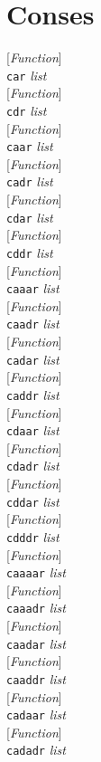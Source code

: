 \documentclass[10pt]{book}
\newenvironment{defother}[2]{[\textit{#1}]\\\texttt{#2}}{\\}
\newenvironment{defun}[1]{\begin{defother}{Function}{#1}}{\end{defother}}
\begin{document}
\section{Conses}
\begin{defun}{car} \textit{list} \end{defun}
\begin{defun}{cdr} \textit{list}\end{defun}
\begin{defun}{caar} \textit{list}\end{defun}
\begin{defun}{cadr} \textit{list}\end{defun}
\begin{defun}{cdar} \textit{list}\end{defun}
\begin{defun}{cddr} \textit{list}\end{defun}
\begin{defun}{caaar} \textit{list}\end{defun}
\begin{defun}{caadr} \textit{list}\end{defun}
\begin{defun}{cadar} \textit{list}\end{defun}
\begin{defun}{caddr} \textit{list}\end{defun}
\begin{defun}{cdaar} \textit{list}\end{defun}
\begin{defun}{cdadr} \textit{list}\end{defun}
\begin{defun}{cddar} \textit{list}\end{defun}
\begin{defun}{cdddr} \textit{list}\end{defun}
\begin{defun}{caaaar} \textit{list}\end{defun}
\begin{defun}{caaadr} \textit{list}\end{defun}
\begin{defun}{caadar} \textit{list}\end{defun}
\begin{defun}{caaddr} \textit{list}\end{defun}
\begin{defun}{cadaar} \textit{list}\end{defun}
\begin{defun}{cadadr} \textit{list}\end{defun}
\end{document}
